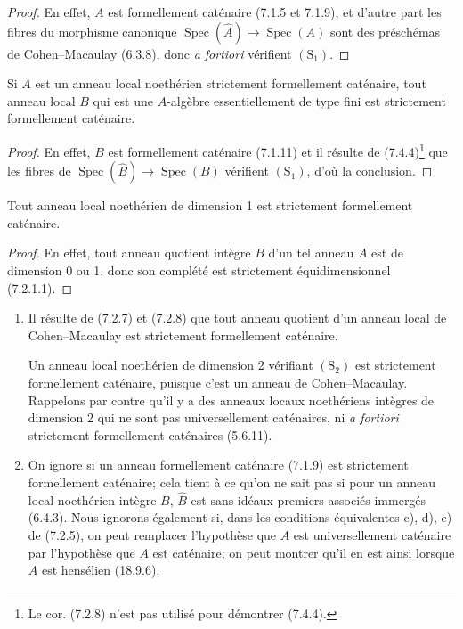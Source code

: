 \begin{proof}
En effet, $A$ est formellement caténaire (7.1.5 et 7.1.9), et d'autre part
les fibres du morphisme canonique
$\operatorname{Spec}(\widehat A)\to\operatorname{Spec}(A)$ sont des
préschémas de Cohen--Macaulay (6.3.8), donc \emph{a fortiori} vérifient
$(\mathrm S_1)$.
\end{proof}

\begin{corollary}[7.2.8]
\label{IV.2.s7.2.8-fr}
Si $A$ est un anneau local noethérien strictement formellement caténaire,
tout anneau local $B$ qui est une $A$-algèbre essentiellement de type fini
est strictement formellement caténaire.
\end{corollary}

\begin{proof}
En effet, $B$ est formellement caténaire (7.1.11) et il résulte de
(7.4.4)\footnote{Le cor. (7.2.8) n'est pas utilisé pour démontrer (7.4.4).}
que les fibres de
$\operatorname{Spec}(\widehat B)\to\operatorname{Spec}(B)$ vérifient
$(\mathrm S_1)$, d'où la conclusion.
\end{proof}

\begin{corollary}[7.2.9]
\label{IV.2.s7.2.9-fr}
Tout anneau local noethérien de dimension 1 est strictement formellement
caténaire.
\end{corollary}

\begin{proof}
En effet, tout anneau quotient intègre $B$ d'un tel anneau $A$ est de
dimension 0 ou 1, donc son complété est strictement équidimensionnel
(7.2.1.1).
\end{proof}

\begin{remarks}[7.2.10]
\label{IV.2.s7.2.10-fr}
\begin{enumerate}
\item[(i)] Il résulte de (7.2.7) et (7.2.8) que tout anneau quotient d'un
anneau local de Cohen--Macaulay est strictement formellement caténaire.

Un anneau local noethérien de dimension 2 vérifiant $(\mathrm S_2)$ est
strictement formellement caténaire, puisque c'est un anneau de
Cohen--Macaulay. Rappelons par contre qu'il y a des anneaux locaux
noethériens intègres de dimension 2 qui ne sont pas universellement
caténaires, ni \emph{a fortiori} strictement formellement caténaires
(5.6.11).
\item[(ii)] On ignore si un anneau formellement caténaire (7.1.9) est
strictement formellement caténaire; cela tient à ce qu'on ne sait pas si
pour un anneau local noethérien intègre $B$, $\widehat B$ est sans idéaux
premiers associés immergés (6.4.3). Nous ignorons également si, dans les
conditions équivalentes c), d), e) de (7.2.5), on peut remplacer
l'hypothèse que $A$ est universellement caténaire par l'hypothèse que $A$
est caténaire; on peut montrer qu'il en est ainsi lorsque $A$ est hensélien
(18.9.6).
\end{enumerate}
\end{remarks}

